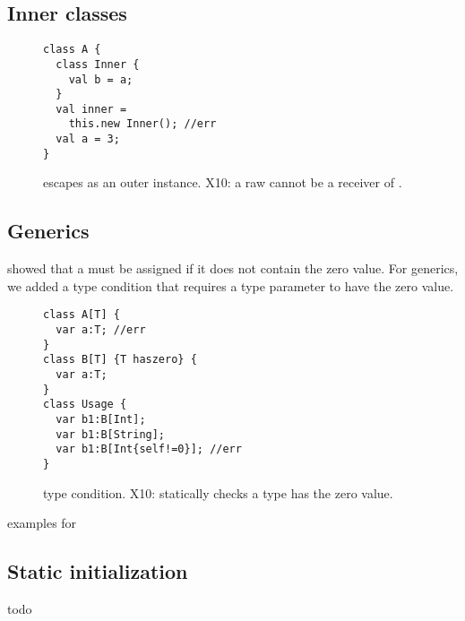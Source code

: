 \subsection{Inner classes}
\begin{figure}
\begin{lstlisting}
class A {
  class Inner {
    val b = a;
  }
  val inner =
    this.new Inner(); //err
  val a = 3;
}
\end{lstlisting}
\caption{\this escapes as an outer instance.
    X10: a raw \this cannot be a receiver of .}
\label{Figure:InnerClass}
\end{figure}


\subsection{Generics}
 showed that a  must be assigned if
    it does not contain the zero value.
For generics, we added a  type condition that requires a type parameter to have the zero value.

\begin{figure}
\begin{lstlisting}
class A[T] {
  var a:T; //err
}
class B[T] {T haszero} {
  var a:T;
}
class Usage {
  var b1:B[Int];
  var b1:B[String];
  var b1:B[Int{self!=0}]; //err
}
\end{lstlisting}
\caption{ type condition.
    X10: statically checks a type has the zero value.}
\label{Figure:Generics}
\end{figure}


examples for 



\subsection{Static initialization}
todo
